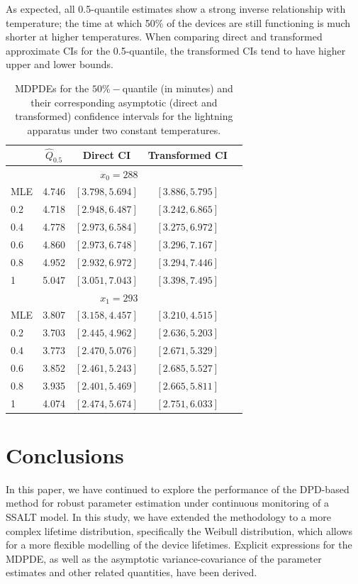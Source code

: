 \documentclass{article}
\begin{document}
As expected, all 0.5-quantile estimates show a strong inverse relationship with temperature; the time at which 50\% of the devices are still functioning is much shorter at higher temperatures. When comparing direct and transformed approximate CIs for the 0.5-quantile, the transformed CIs tend to have higher upper and lower bounds.

\begin{table}[htb]

	\centering
	\caption{MDPDEs for the $50\%-$quantile (in minutes) and their corresponding asymptotic (direct and transformed) confidence intervals for the lightning apparatus under two constant temperatures.}
	\label{tab:estimates_median_and_cis}
\begin{tabular}{lcccc}	

\toprule
& $\hat{Q}_{0.5}$ & Direct CI & Transformed CI \\
\midrule
\multicolumn{4}{c}{$x_0 = 288$} \\
\midrule
MLE & 4.746 & $[3.798, 5.694]$ & $[3.886, 5.795]$ \\
0.2 & 4.718 & $[2.948, 6.487]$ & $[3.242, 6.865]$ \\
0.4 & 4.778 & $[2.973, 6.584]$ & $[3.275, 6.972]$ \\
0.6 & 4.860 & $[2.973, 6.748]$ & $[3.296, 7.167]$ \\
0.8 & 4.952 & $[2.932, 6.972]$ & $[3.294, 7.446]$ \\
1 & 5.047 & $[3.051, 7.043]$ & $[3.398, 7.495]$ \\
\midrule
\multicolumn{4}{c}{$x_1 = 293$} \\
\midrule
MLE & 3.807 & $[3.158, 4.457]$ & $[3.210, 4.515]$ \\
0.2 & 3.703 & $[2.445, 4.962]$ & $[2.636, 5.203]$ \\
0.4 & 3.773 & $[2.470, 5.076]$ & $[2.671, 5.329]$ \\
0.6 & 3.852 & $[2.461, 5.243]$ & $[2.685, 5.527]$ \\
0.8 & 3.935 & $[2.401, 5.469]$ & $[2.665, 5.811]$ \\
1 & 4.074 & $[2.474, 5.674]$ & $[2.751, 6.033]$ \\

\bottomrule
\end{tabular}
\end{table}


\section{Conclusions}
In this paper, we have continued to explore the performance of the DPD-based method for robust parameter estimation under continuous monitoring of a SSALT model. In this study, we have extended the methodology to a more complex lifetime distribution, specifically the Weibull distribution, which allows for a more flexible modelling of the device lifetimes. Explicit expressions for the MDPDE, as well as the asymptotic variance-covariance of the parameter estimates and other related quantities, have been derived.
\end{document}
